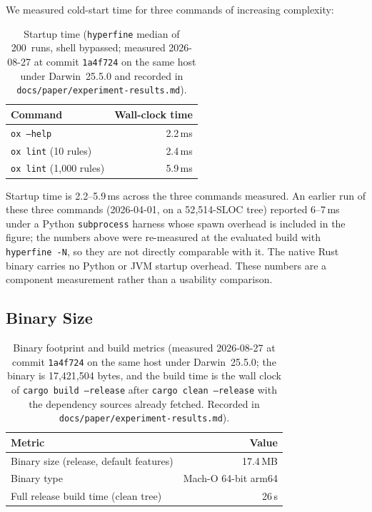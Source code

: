 \documentclass[12pt,a4paper]{article}
\newcommand{\code}[1]{{\texttt{\small\color{inlinecode}#1}}}
\begin{document}
We measured cold-start time for three commands of increasing complexity:

\begin{table}[htbp]
\centering\small
\begin{tabular}{@{}lr@{}}
\toprule
\textbf{Command} & \textbf{Wall-clock time} \\
\midrule
\code{ox --help}             & 2.2\,ms \\
\code{ox lint} (10 rules)    & 2.4\,ms \\
\code{ox lint} (1{,}000 rules) & 5.9\,ms \\
\bottomrule
\end{tabular}
\caption{Startup time (\code{hyperfine} median of 200~runs, shell
  bypassed; measured 2026-08-27 at commit \code{1a4f724} on the same
  host under Darwin~25.5.0 and recorded in
  \code{docs/paper/experiment-results.md}).}
\label{tab:startup}
\end{table}

\noindent Startup time is 2.2--5.9\,ms across the three commands
measured. An earlier run of these three commands (2026-04-01, on a
52{,}514-SLOC tree) reported 6--7\,ms under a Python
\code{subprocess} harness whose spawn overhead is included in the
figure; the numbers above were re-measured at the evaluated build with
\code{hyperfine -N}, so they are not directly comparable with it. The
native Rust binary carries no Python or JVM startup overhead. These
numbers are a component measurement rather than a usability comparison.

\subsection{Binary Size}
\label{sec:binary-bench}

\begin{table}[htbp]
\centering\small
\begin{tabular}{@{}lr@{}}
\toprule
\textbf{Metric} & \textbf{Value} \\
\midrule
Binary size (release, default features) & 17.4\,MB \\
Binary type & Mach-O 64-bit arm64 \\
Full release build time (clean tree) & 26\,s \\
\bottomrule
\end{tabular}
\caption{Binary footprint and build metrics (measured 2026-08-27 at
  commit \code{1a4f724} on the same host under Darwin~25.5.0; the
  binary is 17{,}421{,}504 bytes, and the build time is the wall clock
  of \code{cargo build --release} after \code{cargo clean --release}
  with the dependency sources already fetched. Recorded in
  \code{docs/paper/experiment-results.md}).}
\label{tab:binary}
\end{table}
\end{document}
